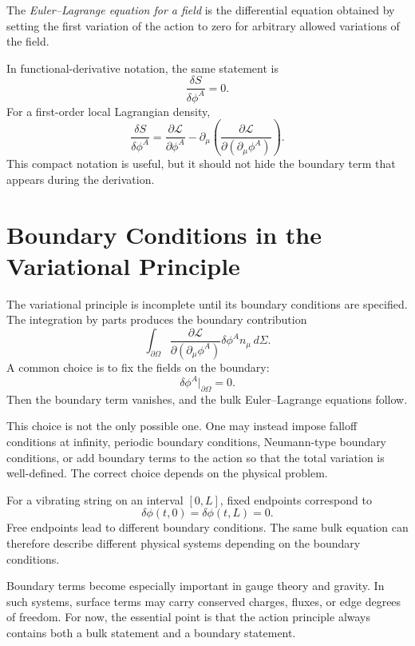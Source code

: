 \begin{definitionbox}
The \emph{Euler--Lagrange equation for a field} is the differential equation
obtained by setting the first variation of the action to zero for arbitrary
allowed variations of the field.
\end{definitionbox}

In functional-derivative notation, the same statement is
\[
    \frac{\delta S}{\delta\phi^A}=0.
\]
For a first-order local Lagrangian density,
\[
    \frac{\delta S}{\delta\phi^A}
    =\frac{\partial\mathcal{L}}{\partial\phi^A}
    -\partial_\mu\left(
        \frac{\partial\mathcal{L}}{\partial(\partial_\mu\phi^A)}
    \right).
\]
This compact notation is useful, but it should not hide the boundary term that
appears during the derivation.

\section{Boundary Conditions in the Variational Principle}

The variational principle is incomplete until its boundary conditions are
specified. The integration by parts produces the boundary contribution
\[
    \int_{\partial\Omega}
        \frac{\partial\mathcal{L}}{\partial(\partial_\mu\phi^A)}
        \delta\phi^A n_\mu\,d\Sigma.
\]
A common choice is to fix the fields on the boundary:
\[
    \delta\phi^A|_{\partial\Omega}=0.
\]
Then the boundary term vanishes, and the bulk Euler--Lagrange equations follow.

This choice is not the only possible one. One may instead impose falloff
conditions at infinity, periodic boundary conditions, Neumann-type boundary
conditions, or add boundary terms to the action so that the total variation is
well-defined. The correct choice depends on the physical problem.

\begin{examplebox}
For a vibrating string on an interval \([0,L]\), fixed endpoints correspond to
\[
    \delta\phi(t,0)=\delta\phi(t,L)=0.
\]
Free endpoints lead to different boundary conditions. The same bulk equation
can therefore describe different physical systems depending on the boundary
conditions.
\end{examplebox}

Boundary terms become especially important in gauge theory and gravity. In such
systems, surface terms may carry conserved charges, fluxes, or edge degrees of
freedom. For now, the essential point is that the action principle always
contains both a bulk statement and a boundary statement.

